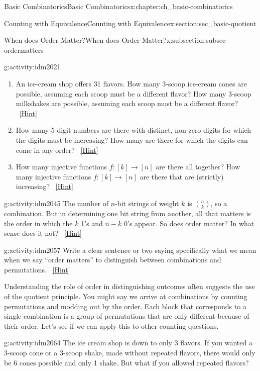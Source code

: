 \documentclass[oneside,10pt,]{book}
\numberwithin{equation}{chapter}
\begin{document}
\begin{chapterptx}{Basic Combinatorics}{}{Basic Combinatorics}{}{}{x:chapter:ch_basic-combinatorics}
\begin{sectionptx}{Counting with Equivalence}{}{Counting with Equivalence}{}{}{x:section:sec_basic-quotient}
\begin{subsectionptx}{When does Order Matter?}{}{When does Order Matter?}{}{}{x:subsection:subsec-ordermatters}
\begin{activity}{}{g:activity:idm2021}
\begin{enumerate}[font=\bfseries,label=(\alph*),ref=\alph*]
\item{}An ice-cream shop offers 31 flavors.  How many 3-scoop ice-cream cones are possible, assuming each scoop must be a different flavor?  How many 3-scoop milkshakes are possible, assuming each scoop must be a different flavor?%
\qquad~\hfill{\tiny\hyperlink{g:hint:idm2027-back}{[Hint]}}\item{}How many 5-digit numbers are there with distinct, non-zero digits for which the digits must be increasing?  How many are there for which the digits can come in any order?%
\qquad~\hfill{\tiny\hyperlink{g:hint:idm2032-back}{[Hint]}}\item{}How many injective functions \(f:[k] \to [n]\) are there all   together?  How many injective functions \(f:[k] \to [n]\) are there that are (strictly) increasing?%
\qquad~\hfill{\tiny\hyperlink{g:hint:idm2042-back}{[Hint]}}\end{enumerate}
\end{activity}
\begin{activity}{}{g:activity:idm2045}%
The number of \(n\)-bit strings of weight \(k\) is \(\binom{n}{k}\), so a combination.  But in determining one bit string from another, all that matters is the order in which the \(k\) 1's and \(n-k\) 0's appear.  So does order matter?  In what sense does it not?%
\qquad~\hfill{\tiny\hyperlink{g:hint:idm2053-back}{[Hint]}}\end{activity}
\begin{activity}{}{g:activity:idm2057}%
Write a clear sentence or two saying specifically what we mean when we say ``order matters'' to distinguish between combinations and permutations.%
\qquad~\hfill{\tiny\hyperlink{g:hint:idm2061-back}{[Hint]}}\end{activity}
Understanding the role of order in distinguishing outcomes often suggests the use of the quotient principle.  You might say we arrive at combinations by counting permutations and modding out by the order.  Each block that corresponds to a single combination is a group of permutations that are only different because of their order.  Let's see if we can apply this to other counting questions.%
\begin{activity}{}{g:activity:idm2064}%
The ice cream shop is down to only 3 flavors.  If you wanted a 3-scoop cone or a 3-scoop shake, made without repeated flavors, there would only be 6 cones possible and only 1 shake.  But what if you allowed repeated flavors?%
\begin{enumerate}[font=\bfseries,label=(\alph*),ref=\alph*]

\end{enumerate}
\end{activity}
\end{subsectionptx}
\end{sectionptx}
\end{chapterptx}
\end{document}
